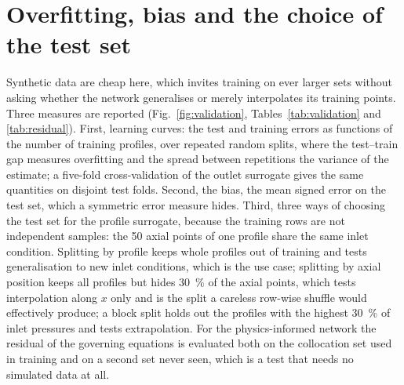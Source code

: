 \documentclass[a4paper,fleqn]{cas-sc}
\begin{document}
\section{Overfitting, bias and the choice of the test set}\label{sec:validation}

Synthetic data are cheap here, which invites training on ever larger sets without asking whether the network generalises or merely interpolates its training points. Three measures are reported (Fig.~\ref{fig:validation}, Tables~\ref{tab:validation} and \ref{tab:residual}). First, learning curves: the test and training errors as functions of the number of training profiles, over repeated random splits, where the test--train gap measures overfitting and the spread between repetitions the variance of the estimate; a five-fold cross-validation of the outlet surrogate gives the same quantities on disjoint test folds. Second, the bias, the mean signed error on the test set, which a symmetric error measure hides. Third, three ways of choosing the test set for the profile surrogate, because the training rows are not independent samples: the 50 axial points of one profile share the same inlet condition. Splitting by profile keeps whole profiles out of training and tests generalisation to new inlet conditions, which is the use case; splitting by axial position keeps all profiles but hides \SI{30}{\percent} of the axial points, which tests interpolation along $x$ only and is the split a careless row-wise shuffle would effectively produce; a block split holds out the profiles with the highest \SI{30}{\percent} of inlet pressures and tests extrapolation. For the physics-informed network the residual of the governing equations is evaluated both on the collocation set used in training and on a second set never seen, which is a test that needs no simulated data at all.
\end{document}
